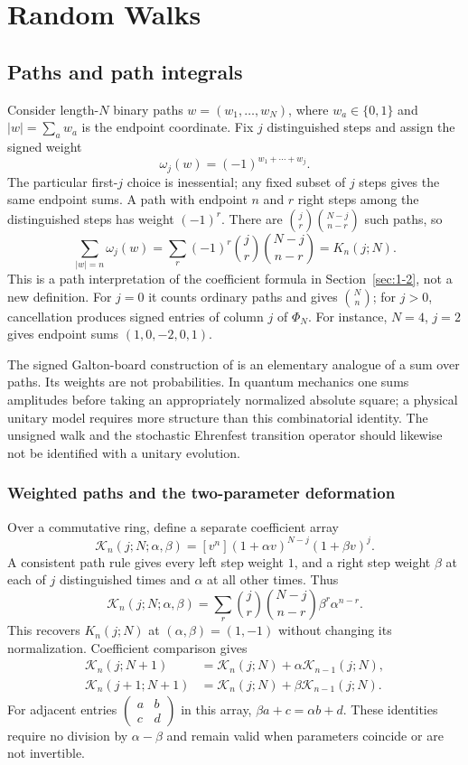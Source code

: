 \chapter{Random Walks}
\label{ch:2}
\section{Paths and path integrals}
\label{sec:2-1}
Consider length-$N$ binary paths $w=(w_1,\ldots,w_N)$, where
$w_a\in\{0,1\}$ and $|w|=\sum_aw_a$ is the endpoint coordinate.
Fix $j$ distinguished steps and assign the signed weight
\[
\omega_j(w)=(-1)^{w_1+\cdots+w_j}.
\]
The particular first-$j$ choice is inessential; any fixed subset of $j$
steps gives the same endpoint sums. A path with endpoint $n$ and $r$
right steps among the distinguished steps has weight $(-1)^r$.
There are $\binom jr\binom{N-j}{n-r}$ such paths, so
\begin{equation}\label{eq:signed-path-Krawtchouk}
\sum_{|w|=n}\omega_j(w)
=\sum_r(-1)^r\binom jr\binom{N-j}{n-r}
=K_n(j;N).
\end{equation}
This is a path interpretation of the coefficient formula in
Section~\ref{sec:1-2}, not a new definition. For $j=0$ it counts ordinary
paths and gives $\binom Nn$; for $j>0$, cancellation produces signed
entries of column $j$ of $\Phi_N$. For instance, $N=4$, $j=2$ gives
endpoint sums $(1,0,-2,0,1)$.

The signed Galton-board construction of \cite[Section~6]{KocikFeynman}
is an elementary analogue of a sum over paths. Its weights are not
probabilities. In quantum mechanics one sums amplitudes before taking
an appropriately normalized absolute square; a physical unitary model
requires more structure than this combinatorial identity. The unsigned
walk and the stochastic Ehrenfest transition operator should likewise
not be identified with a unitary evolution.


\subsection{Weighted paths and the two-parameter deformation}
\label{sec:weighted-path-deformation}
Over a commutative ring, define a separate coefficient array
\[
\mathcal K_n(j;N;\alpha,\beta)
=[v^n](1+\alpha v)^{N-j}(1+\beta v)^j.
\]
A consistent path rule gives every left step weight $1$, and a right
step weight $\beta$ at each of $j$ distinguished times and $\alpha$ at
all other times. Thus
\[
\mathcal K_n(j;N;\alpha,\beta)
=\sum_r\binom jr\binom{N-j}{n-r}\beta^r\alpha^{n-r}.
\]
This recovers $K_n(j;N)$ at $(\alpha,\beta)=(1,-1)$ without changing
its normalization. Coefficient comparison gives
\begin{align*}
\mathcal K_n(j;N+1)&=\mathcal K_n(j;N)+\alpha\mathcal K_{n-1}(j;N),\\
\mathcal K_n(j+1;N+1)&=\mathcal K_n(j;N)+\beta\mathcal K_{n-1}(j;N).
\end{align*}
For adjacent entries $\begin{pmatrix}a&b\\c&d\end{pmatrix}$ in this
array, $\beta a+c=\alpha b+d$.
These identities require no division by $\alpha-\beta$ and remain valid
when parameters coincide or are not invertible.


